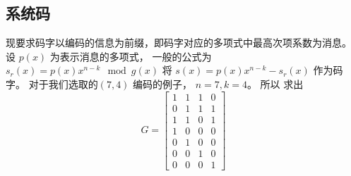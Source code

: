 \documentclass{article}
\begin{document}
\subsection{系统码}
现要求码字以编码的信息为前缀，即码字对应的多项式中最高次项系数为消息。
设 $ p(x) $ 为表示消息的多项式， 一般的公式为
$ s_r(x) = p(x) x^{n-k} \mod g(x) $
将 $ s(x) = p(x) x^{n-k} - s_r(x) $ 作为码字。
对于我们选取的$(7, 4)$ 编码的例子， $ n = 7, k = 4$。 所以 求出 $$
G = \begin{bmatrix}
1 & 1 & 1 & 0 \\
0 & 1 & 1 & 1 \\
1 & 1 & 0 & 1 \\
1 & 0 & 0 & 0 \\
0 & 1 & 0 & 0 \\
0 & 0 & 1 & 0 \\
0 & 0 & 0 & 1
\end{bmatrix}
$$
\end{document}

